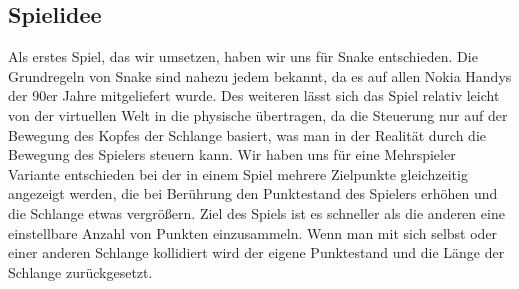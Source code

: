 \subsection{Spielidee}
Als erstes Spiel, das wir umsetzen, haben wir uns für Snake entschieden. Die Grundregeln von Snake sind nahezu jedem bekannt, da es auf allen Nokia Handys der 90er Jahre mitgeliefert wurde. Des weiteren lässt sich das Spiel
relativ leicht von der virtuellen Welt in die physische übertragen, da die Steuerung nur auf der Bewegung des Kopfes der Schlange basiert, was man in der Realität durch die Bewegung des Spielers steuern kann. Wir haben uns
für eine Mehrspieler Variante entschieden bei der in einem Spiel mehrere Zielpunkte gleichzeitig angezeigt werden, die bei Berührung den Punktestand des Spielers erhöhen und die Schlange etwas vergrößern. Ziel des Spiels ist es schneller als die anderen eine einstellbare Anzahl von Punkten einzusammeln. Wenn man mit sich selbst oder einer anderen Schlange kollidiert wird der eigene Punktestand und die Länge der Schlange zurückgesetzt.